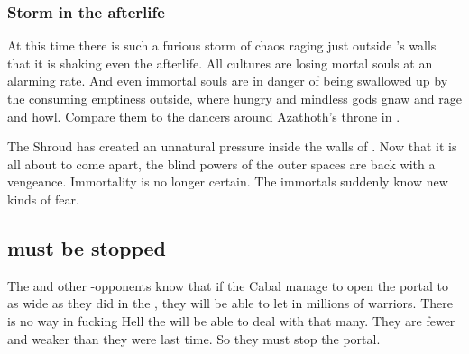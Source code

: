 




\subsubsection{Storm in the afterlife}
At this time there is such a furious storm of chaos raging just outside \Miith's walls that it is shaking even the afterlife. 
All cultures are losing mortal souls at an alarming rate.
And even immortal souls are in danger of being swallowed up by the consuming emptiness outside, where hungry and mindless gods gnaw and rage and howl. 
Compare them to the dancers around Azathoth's throne in \cite{HPLovecraft:TheDreamQuestofUnknownKadath}.

The Shroud has created an unnatural pressure inside the walls of \Miith. 
Now that it is all about to come apart, the blind powers of the outer spaces are back with a vengeance. 
Immortality is no longer certain. 
The immortals suddenly know new kinds of fear. 









\subsection{\Voidbringer must be stopped}
The \dragons{} and other \bane-opponents know that if the Cabal manage to open the portal to \Erebos{} as wide as they did in the \secondbanewar, they will be able to let in millions of \bane{} warriors. 
There is no way in fucking Hell the \Miithians will be able to deal with that many.
They are fewer and weaker than they were last time. 
So they must stop the portal. 








